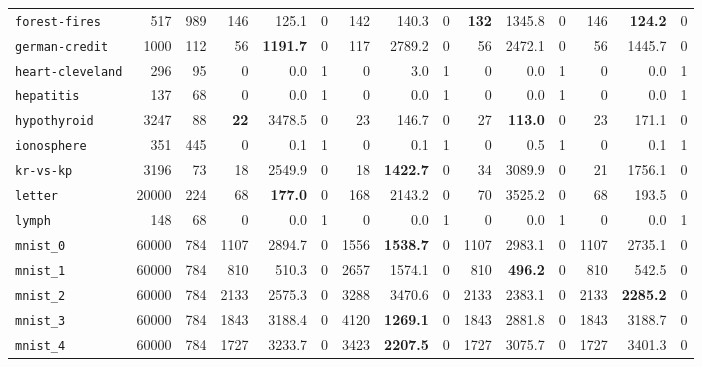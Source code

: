 \begin{tabular}{lccrrrrrrrrrrrr}
\texttt{forest-fires} & \multicolumn{1}{r}{517} & \multicolumn{1}{r}{989}  & 146 & 125.1 & 0 & 142 & 140.3 & 0 & \textbf{132} & 1345.8 & 0 & 146 & \textbf{124.2} & 0\\
\texttt{german-credit} & \multicolumn{1}{r}{1000} & \multicolumn{1}{r}{112}  & 56 & \textbf{1191.7} & 0 & 117 & 2789.2 & 0 & 56 & 2472.1 & 0 & 56 & 1445.7 & 0\\
\texttt{heart-cleveland} & \multicolumn{1}{r}{296} & \multicolumn{1}{r}{95}  & 0 & 0.0 & 1 & 0 & 3.0 & 1 & 0 & 0.0 & 1 & 0 & 0.0 & 1\\
\texttt{hepatitis} & \multicolumn{1}{r}{137} & \multicolumn{1}{r}{68}  & 0 & 0.0 & 1 & 0 & 0.0 & 1 & 0 & 0.0 & 1 & 0 & 0.0 & 1\\
\texttt{hypothyroid} & \multicolumn{1}{r}{3247} & \multicolumn{1}{r}{88}  & \textbf{22} & 3478.5 & 0 & 23 & 146.7 & 0 & 27 & \textbf{113.0} & 0 & 23 & 171.1 & 0\\
\texttt{ionosphere} & \multicolumn{1}{r}{351} & \multicolumn{1}{r}{445}  & 0 & 0.1 & 1 & 0 & 0.1 & 1 & 0 & 0.5 & 1 & 0 & 0.1 & 1\\
\texttt{kr-vs-kp} & \multicolumn{1}{r}{3196} & \multicolumn{1}{r}{73}  & 18 & 2549.9 & 0 & 18 & \textbf{1422.7} & 0 & 34 & 3089.9 & 0 & 21 & 1756.1 & 0\\
\texttt{letter} & \multicolumn{1}{r}{20000} & \multicolumn{1}{r}{224}  & 68 & \textbf{177.0} & 0 & 168 & 2143.2 & 0 & 70 & 3525.2 & 0 & 68 & 193.5 & 0\\
\texttt{lymph} & \multicolumn{1}{r}{148} & \multicolumn{1}{r}{68}  & 0 & 0.0 & 1 & 0 & 0.0 & 1 & 0 & 0.0 & 1 & 0 & 0.0 & 1\\
\texttt{mnist\_0} & \multicolumn{1}{r}{60000} & \multicolumn{1}{r}{784}  & 1107 & 2894.7 & 0 & 1556 & \textbf{1538.7} & 0 & 1107 & 2983.1 & 0 & 1107 & 2735.1 & 0\\
\texttt{mnist\_1} & \multicolumn{1}{r}{60000} & \multicolumn{1}{r}{784}  & 810 & 510.3 & 0 & 2657 & 1574.1 & 0 & 810 & \textbf{496.2} & 0 & 810 & 542.5 & 0\\
\texttt{mnist\_2} & \multicolumn{1}{r}{60000} & \multicolumn{1}{r}{784}  & 2133 & 2575.3 & 0 & 3288 & 3470.6 & 0 & 2133 & 2383.1 & 0 & 2133 & \textbf{2285.2} & 0\\
\texttt{mnist\_3} & \multicolumn{1}{r}{60000} & \multicolumn{1}{r}{784}  & 1843 & 3188.4 & 0 & 4120 & \textbf{1269.1} & 0 & 1843 & 2881.8 & 0 & 1843 & 3188.7 & 0\\
\texttt{mnist\_4} & \multicolumn{1}{r}{60000} & \multicolumn{1}{r}{784}  & 1727 & 3233.7 & 0 & 3423 & \textbf{2207.5} & 0 & 1727 & 3075.7 & 0 & 1727 & 3401.3 & 0\\

\end{tabular}

